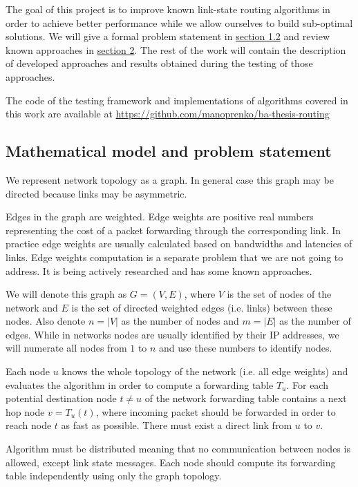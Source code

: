 The goal of this project is to improve known link-state routing algorithms in order to achieve better performance while we allow ourselves to build sub-optimal solutions. We will give a formal problem statement in \hyperref[sec:statement]{section 1.2} and review known approaches in \hyperref[sec:known]{section 2}. The rest of the work will contain the description of developed approaches and results obtained during the testing of those approaches.

The code of the testing framework and implementations of algorithms covered in this work are available at \url{https://github.com/manoprenko/ba-thesis-routing}

\subsection{Mathematical model and problem statement}
\label{sec:statement}

We represent network topology as a graph. In general case this graph may be directed because links may be asymmetric.

Edges in the graph are weighted. Edge weights are positive real numbers representing the cost of a packet forwarding through the corresponding link. In practice edge weights are usually calculated based on bandwidths and latencies of links. Edge weights computation is a separate problem that we are not going to address. It is being actively researched and has some known approaches.

We will denote this graph as $G = (V, E)$, where $V$ is the set of nodes of the network and $E$ is the set of directed weighted edges (i.e. links) between these nodes. Also denote $n = |V|$ as the number of nodes and $m = |E|$ as the number of edges. While in networks nodes are usually identified by their IP addresses, we will numerate all nodes from $1$ to $n$ and use these numbers to identify nodes.

Each node $u$ knows the whole topology of the network (i.e. all edge weights) and evaluates the algorithm in order to compute a forwarding table $T_u$. For each potential destination node $t \neq u$ of the network forwarding table contains a next hop node $v = T_u(t)$, where incoming packet should be forwarded in order to reach node $t$ as fast as possible. There must exist a direct link from $u$ to $v$.

Algorithm must be distributed meaning that no communication between nodes is allowed, except link state messages. Each node should compute its forwarding table independently using only the graph topology.


